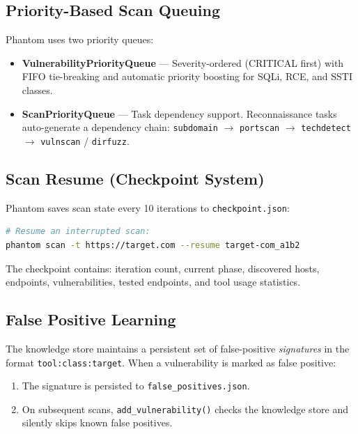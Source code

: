 \documentclass[12pt,a4paper]{article}
\begin{document}
\subsection{Priority-Based Scan Queuing}

Phantom uses two priority queues:
\begin{itemize}
    \item \textbf{VulnerabilityPriorityQueue} — Severity-ordered (CRITICAL
          first) with FIFO tie-breaking and automatic priority boosting for
          SQLi, RCE, and SSTI classes.
    \item \textbf{ScanPriorityQueue} — Task dependency support. Reconnaissance
          tasks auto-generate a dependency chain:
          \texttt{subdomain} $\rightarrow$ \texttt{portscan} $\rightarrow$
          \texttt{techdetect} $\rightarrow$ \texttt{vulnscan} /
          \texttt{dirfuzz}.
\end{itemize}

\subsection{Scan Resume (Checkpoint System)}

Phantom saves scan state every 10 iterations to \texttt{checkpoint.json}:
\begin{lstlisting}[language=bash]
# Resume an interrupted scan:
phantom scan -t https://target.com --resume target-com_a1b2
\end{lstlisting}

The checkpoint contains: iteration count, current phase, discovered hosts,
endpoints, vulnerabilities, tested endpoints, and tool usage statistics.

\subsection{False Positive Learning}

The knowledge store maintains a persistent set of false-positive \textit{signatures}
in the format \texttt{tool:class:target}. When a vulnerability is marked as
false positive:

\begin{enumerate}
    \item The signature is persisted to \texttt{false\_positives.json}.
    \item On subsequent scans, \texttt{add\_vulnerability()} checks the
          knowledge store and silently skips known false positives.
\end{enumerate}
\end{document}
